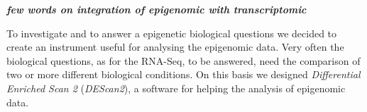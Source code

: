 
\textbf{\textsl{few words on integration of epigenomic with transcriptomic}}

To investigate and to answer a epigenetic biological questions we decided to create an instrument useful for analysing the epigenomic data.
Very often the biological questions, as for the RNA-Seq, to be answered, need the comparison of two or more different biological conditions.
On this basis we designed \textit{Differential Enriched Scan 2} (\textit{DEScan2}), a software for helping the analysis of epigenomic data.		